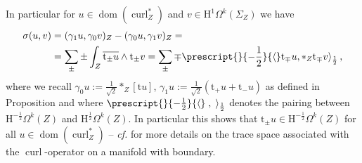 \begin{Example}
	In particular for $u\in\operatorname{dom}(\operatorname{curl}_Z^*)$ and $v\in\mathrm{H}^1\Omega^k(\Sigma_Z)$ we have
	\begin{align}\label{Eqn: simplified form for presymplectic structure}
		\sigma(u,v)&=
		(\gamma_1u,\gamma_0v)_Z-(\gamma_0u,\gamma_1v)_Z=\\&=
		\sum_\pm\pm\int_Z\overline{\mathrm{t}_\pm u}\wedge\mathrm{t}_\pm v=
		\sum_\pm\mp\prescript{}{-\frac{1}{2}}{\langle}\mathrm{t}_\mp u,\ast_Z\mathrm{t}_\mp v\rangle_{\frac{1}{2}}\,,
	\end{align}
	where we recall $\gamma_0u:=\frac{1}{\sqrt{2}}\ast_Z[\mathrm{t}u]$,
	$\gamma_1u:=\frac{1}{\sqrt{2}}(\mathrm{t}_+u+\mathrm{t}_-u)$ as defined in Proposition  and
	where $\prescript{}{-\frac{1}{2}}{\langle}\;,\;\rangle_{\frac{1}{2}}$ denotes the pairing between $\mathrm{H}^{-\frac{1}{2}}\Omega^k(Z)$ and $\mathrm{H}^{\frac{1}{2}}\Omega^k(Z)$.
	In particular this shows that $\mathrm{t}_\pm u\in\mathrm{H}^{-\frac{1}{2}}\Omega^k(Z)$ for all $u\in\operatorname{dom}(\operatorname{curl}_Z^*)$ -- \textit{cf.} \cite{Alonso-Valli-96,Buffa-Costabel-Sheen-02,Georgescu-79,Paquet-82,Weck-04} for more details on the trace space associated with the $\operatorname{curl}$-operator on a manifold with boundary.
	

\end{Example}
